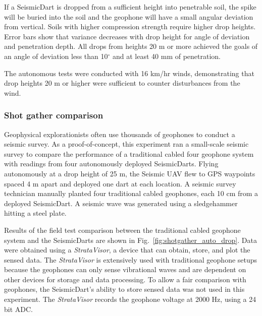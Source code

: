 If a SeismicDart is dropped from a sufficient height into penetrable soil, the spike will be buried into the soil and the geophone will have a small angular deviation from vertical. Soils with higher compression strength require higher drop heights. Error bars show that variance decreases with drop height for angle of deviation and penetration depth.  
 All drops from heights 20 m or more achieved the goals of an angle of deviation less than 10$^\circ$ and at least 40 mm of penetration.   

The autonomous tests were conducted with 16 km/hr winds, demonstrating that drop heights 20 m or higher were sufficient to counter disturbances from the wind. %

\subsubsection{Shot gather comparison} 
Geophysical explorationists often use thousands of geophones to conduct a seismic survey. 
 As a proof-of-concept, this experiment ran a small-scale seismic survey to compare the performance of a traditional cabled four geophone system with readings from four autonomously deployed SeismicDarts.
Flying autonomously at a drop height of 25 m, the Seismic UAV flew to GPS waypoints spaced 4 m apart and deployed one dart at each location. 
A seismic survey technician manually planted four traditional cabled geophones, each 10 cm from a deployed SeismicDart. 
A seismic wave was generated using a sledgehammer hitting a steel plate.

Results of the field test comparison between the traditional cabled geophone system and the SeismicDarts are shown in Fig.~\ref{fig:shotgather_auto_drop}.   
Data were obtained using a \emph{StrataVisor}, a device that can obtain, store, and plot the sensed data. 
The \emph{StrataVisor} is extensively used with traditional geophone setups because the geophones can only sense vibrational waves and are dependent on other devices for storage and data processing. 
To allow a fair comparison with geophones, the SeismicDart's  ability to store sensed data was not used in this experiment. 
 The \emph{StrataVisor} records the geophone voltage at 2000 Hz, using a 24 bit ADC.

